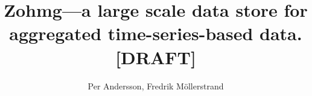 \newcommand{\chapterquote}[2] {
\begin{quote}
\textit{"{#1}"}

--- {#2}
\end{quote}
\vspace{12pt}
}


\documentclass[a4paper]{report}
\usepackage{graphicx}

\author{Per Andersson, Fredrik M{\"o}llerstrand}
\title{Zohmg---a large scale data store for aggregated time-series-based
data. [DRAFT]}


\maketitle

\noindent {\Large \textbf{Abstract}}
\vspace{12pt}
\noindent


Making sense of data at a massive scale is one of the biggest challenges we face
at Last.fm. Interpreting patterns in user behaviour becomes a challenge when
millions of users interact in billions of combinations; the data sets must be
analyzed, summarized and presented visually in order to convey their meaning.

This thesis describes a data store for multi-dimensional time-series-based data.
Measurements are summarized across multiple dimensions. The data store is
optimized for speed of data retrieval: one of the design goals is to serve data
at mouse-click rate to promote real-time data exploration.

Similar data stores exist; they generally use relational database systems as
their backing database. The novelty of our approach is to model multidimensional
data cubes on top of a column-oriented database, reaping the scalability
benefits of such databases.

The thesis is presented in three major sections: problem statement,
theoretical solution and implementation details.


\tableofcontents
\vfill
\pagebreak

\chapter{Introduction}

\section{Background}


